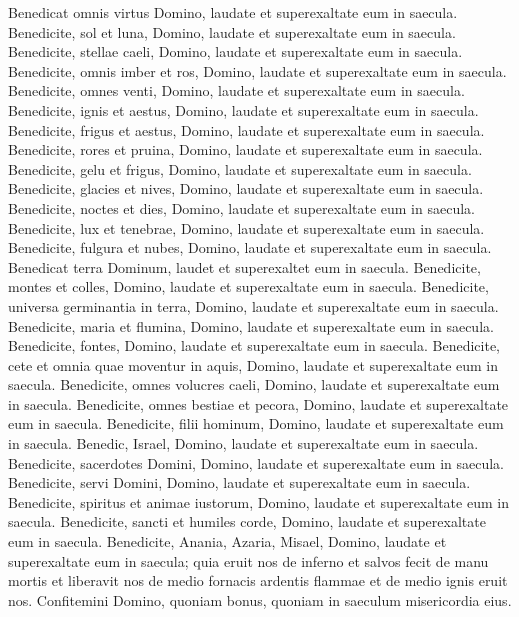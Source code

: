 \begin{biblechapter}
\verse Benedicat omnis virtus Domino, laudate et superexaltate eum in saecula. 
\verse Benedicite, sol et luna, Domino, laudate et superexaltate eum in saecula. 
\verse Benedicite, stellae caeli, Domino, laudate et superexaltate eum in saecula. 
\verse Benedicite, omnis imber et ros, Domino, laudate et superexaltate eum in saecula. 
\verse Benedicite, omnes venti, Domino, laudate et superexaltate eum in saecula. 
\verse Benedicite, ignis et aestus, Domino, laudate et superexaltate eum in saecula. 
\verse Benedicite, frigus et aestus, Domino, laudate et superexaltate eum in saecula. 
\verse Benedicite, rores et pruina, Domino, laudate et superexaltate eum in saecula. 
\verse Benedicite, gelu et frigus, Domino, laudate et superexaltate eum in saecula. 
\verse Benedicite, glacies et nives, Domino, laudate et superexaltate eum in saecula. 
\verse Benedicite, noctes et dies, Domino, laudate et superexaltate eum in saecula. 
\verse Benedicite, lux et tenebrae, Domino, laudate et superexaltate eum in saecula. 
\verse Benedicite, fulgura et nubes, Domino, laudate et superexaltate eum in saecula. 
\verse Benedicat terra Dominum, laudet et superexaltet eum in saecula. 
\verse Benedicite, montes et colles, Domino, laudate et superexaltate eum in saecula. 
\verse Benedicite, universa germinantia in terra, Domino, laudate et superexaltate eum in saecula. 
\verse Benedicite, maria et flumina, Domino, laudate et superexaltate eum in saecula. 
\verse Benedicite, fontes, Domino, laudate et superexaltate eum in saecula. 
\verse Benedicite, cete et omnia quae moventur in aquis, Domino, laudate et superexaltate eum in saecula. 
\verse Benedicite, omnes volucres caeli, Domino, laudate et superexaltate eum in saecula. 
\verse Benedicite, omnes bestiae et pecora, Domino, laudate et superexaltate eum in saecula. 
\verse Benedicite, filii hominum, Domino, laudate et superexaltate eum in saecula. 
\verse Benedic, Israel, Domino, laudate et superexaltate eum in saecula. 
\verse Benedicite, sacerdotes Domini, Domino, laudate et superexaltate eum in saecula. 
\verse Benedicite, servi Domini, Domino, laudate et superexaltate eum in saecula. 
\verse Benedicite, spiritus et animae iustorum, Domino, laudate et superexaltate eum in saecula. 
\verse Benedicite, sancti et humiles corde, Domino, laudate et superexaltate eum in saecula. 
\verse Benedicite, Anania, Azaria, Misael, Domino, laudate et superexaltate eum in saecula; quia eruit nos de inferno et salvos fecit de manu mortis et liberavit nos de medio fornacis ardentis flammae et de medio ignis eruit nos. 
\verse Confitemini Domino, quoniam bonus, quoniam in saeculum misericordia eius. 

\end{biblechapter}
